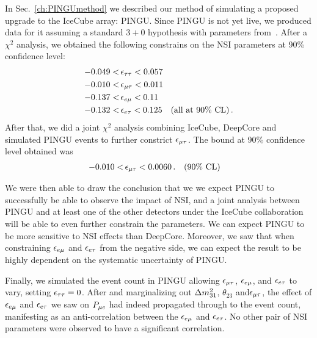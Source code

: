 In Sec.~\ref{ch:PINGUmethod} we described our method of simulating a proposed upgrade to the IceCube array: PINGU.
Since PINGU is not yet live, we produced data for it assuming a standard $3+0$ hypothesis with parameters from~\cite{nufit}.
After a $\chi^2$ analysis, we obtained the following constrains on the NSI parameters at 90\% confidence level:
\begin{align}
    -0.049 <&\, \epsilon_{\tau\tau} < 0.057 \nonumber \\
    -0.010 <&\, \epsilon_{\mu\tau} < 0.011 \nonumber \\
    -0.137 <&\, \epsilon_{e\mu} < 0.11 \nonumber \\
    -0.132 <&\, \epsilon_{e\tau} < 0.125 \quad (\text{all at }90\% \text{ CL})\,.
 \end{align}
After that, we did a joint $\chi^2$ analysis combining IceCube, DeepCore and simulated PINGU events to further constrict $\epsilon_{\mu\tau}$. The bound at 90\% confidence level obtained was
\begin{align}
    -0.010 <&\, \epsilon_{\mu\tau} < 0.0060\,. \quad (90\% \text{ CL})
 \end{align}

We were then able to draw the conclusion that we we expect PINGU to successfully be able to observe the impact of NSI, and a joint analysis between PINGU and at least one of the other detectors under the IceCube collaboration
will be able to even further constrain the parameters. We can expect PINGU to be more sensitive to NSI effects than DeepCore. Moreover, we saw that when constraining $\epsilon_{e\mu}$ and $\epsilon_{e\tau}$ from the negative side, 
we can expect the result to be highly dependent on the systematic uncertainty of PINGU.

Finally, we simulated the event count in PINGU allowing $\epsilon_{\mu\tau}$, $\epsilon_{e\mu}$, and $\epsilon_{e\tau}$ to vary, setting $\epsilon_{\tau\tau}=0$.
After and marginalizing out $\dm[31]$, $\theta_{23}$ and$\epsilon_{\mu\tau}$, the effect of $\epsilon_{e\mu}$ and $\epsilon_{e\tau}$ we saw on $P_{\mu e}$ had indeed propagated through to the event count,
manifesting as an anti-correlation between the $\epsilon_{e\mu}$ and $\epsilon_{e\tau}$. No other pair of NSI parameters were observed to have 
a significant correlation.